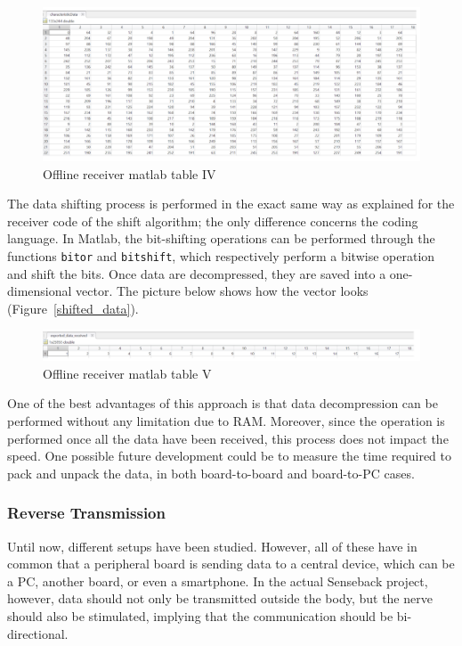 \documentclass{Configuration_Files/PoliMi3i_thesis}
\begin{document}
\begin{figure}[H]
    \centering
    \includegraphics[scale=0.6]{Board Windows PC/7.png}
    \caption{Offline receiver matlab table IV}
    \label{boardwindows_7}
\end{figure}

The data shifting process is performed in the exact same way as explained for the receiver code of the shift algorithm; the only difference concerns the coding language. In Matlab, the bit-shifting operations can be performed through the functions \texttt{bitor} and \texttt{bitshift}, which respectively perform a bitwise operation and shift the bits. Once data are decompressed, they are saved into a one-dimensional vector. The picture below shows how the vector looks (Figure~\ref{shifted_data}).

\begin{figure}[H]
    \centering
    \includegraphics[scale=0.6]{Board Windows PC/8.png}
    \caption{Offline receiver matlab table V}
    \label{boardwindows_8}
\end{figure}

One of the best advantages of this approach is that data decompression can be performed without any limitation due to RAM. Moreover, since the operation is performed once all the data have been received, this process does not impact the speed. One possible future development could be to measure the time required to pack and unpack the data, in both board-to-board and board-to-PC cases.

\subsubsection{Reverse Transmission}

Until now, different setups have been studied. However, all of these have in common that a peripheral board is sending data to a central device, which can be a PC, another board, or even a smartphone. In the actual Senseback project, however, data should not only be transmitted outside the body, but the nerve should also be stimulated, implying that the communication should be bi-directional.
\end{document}

